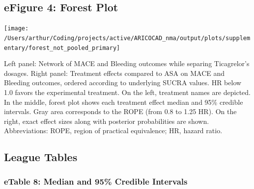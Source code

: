 \documentclass[
  12pt,
]{article}
\begin{document}
\begin{landscape}

\hypertarget{efigure-4-forest-plot}{%
\subsection{eFigure 4: Forest Plot}\label{efigure-4-forest-plot}}

\begin{center}\texttt{[image: /Users/arthur/Coding/projects/active/ARICOCAD\_nma/output/plots/supplementary/forest\_not\_pooled\_primary]} \end{center}

Left panel: Network of MACE and Bleeding outcomes while separing
Ticagrelor's dosages. Right panel: Treatment effects compared to ASA on
MACE and Bleeding outcomes, ordered according to underlying SUCRA
values. HR below 1.0 favors the experimental treatment. On the left,
treatment names are depicted. In the middle, forest plot shows each
treatment effect median and 95\% credible intervals. Gray area
corresponds to the ROPE (from 0.8 to 1.25 HR). On the right, exact
effect sizes along with posterior probabilities are shown.
Abbreviations: ROPE, region of practical equivalence; HR, hazard ratio.

\hypertarget{league-tables-1}{%
\subsection{League Tables}\label{league-tables-1}}

\hypertarget{etable-8-median-and-95-credible-intervals}{%
\subsubsection{eTable 8: Median and 95\% Credible
Intervals}\label{etable-8-median-and-95-credible-intervals}}


\end{landscape}
\end{document}
